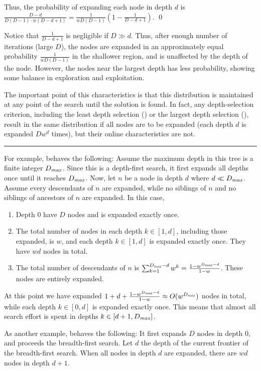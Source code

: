 Thus, the probability of expanding each node in depth $d$ is
$\frac{D-d}{D(D-1)\cdot w(D-d+1)}=\frac{1}{wD(D-1)}(1-\frac{1}{D-d+1})$.  \qed

Notice that $\frac{1}{D-d+1}$ is negligible if $D \gg d$.
Thus, after enough number of iterations (large $D$), the nodes are 
expanded in an approximately equal probability $\frac{1}{wD(D-1)}$ in the shallower region, and is
unaffected by the depth of the node.
However, the nodes near the largest depth has less probability, showing
some balance in exploration and exploitation.

The important point of this characteristics is that this distribution is maintained at any point of the search
until the solution is found. In fact, any depth-selection criterion, including the least depth selection (\fifo) or
the largest depth selection (\lifo), result in the same distribution if all nodes are to be expanded (each depth
$d$ is expanded $Dw^d$ times), but their online characteristics are not.
%

\hrule

For example, \lifo behaves the following: Assume the maximum depth in this tree is a finite integer
$D_{\mit{max}}$. Since this is a depth-first search, it first expands all depths once until it reaches
$D_{\mit{max}}$.
% 
% 
Now, let $n$ be a node in depth $d$ where $d\ll D_{\mit{max}}$.  Assume every descendants of $n$ are expanded,
while no siblings of $n$ and no siblings of ancestors of $n$ are expanded.  In this case,
\begin{enumerate}
 \item Depth 0 have $D$ nodes and is expanded exactly once.
 \item The total number of nodes in each depth $k\in [1,d]$, including those expanded, is $w$, and each depth $k\in [1,d]$ is expanded exactly once. They have $wd$ nodes in total.
 \item The total number of descendants of $n$ is $\sum_{k=1}^{D_{\mit{max}}-d} w^k = \frac{1-w^{D_{\mit{max}}-d}}{1-w}$. These nodes are entirely expanded.
\end{enumerate}
At this point we have expanded $1+d+\frac{1-w^{D_{\mit{max}}-d}}{1-w} \approx O(w^{D_{\mit{max}}})$ nodes in total,
while each depth $k\in [0,d]$ is expanded exactly once.
This means that almost all search effort is spent in depths $k\in [d+1,D_{\mit{max}}]$.

As another example, \fifo behaves the following: It first expands $D$ nodes in depth 0, and proceeds the
breadth-first search. Let $d$ the depth of the current frontier of the breadth-first search. When all nodes in
depth $d$ are expanded, there are $wd$ nodes in depth $d+1$.
